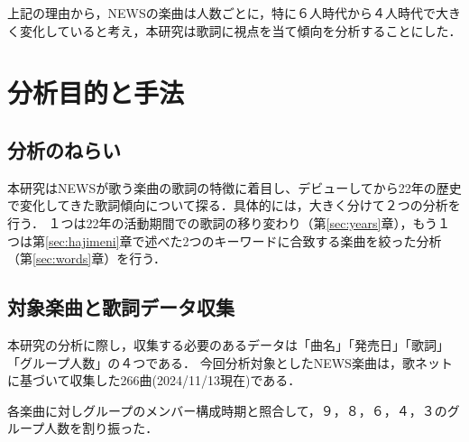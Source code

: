 
上記の理由から，NEWSの楽曲は人数ごとに，特に６人時代から４人時代で大きく変化していると考え，本研究は歌詞に視点を当て傾向を分析することにした．



\section{分析目的と手法}\label{sec:houhou}

\subsection{分析のねらい}

本研究はNEWSが歌う楽曲の歌詞の特徴に着目し、デビューしてから22年の歴史で変化してきた歌詞傾向について探る．具体的には，大きく分けて２つの分析を行う．
１つは22年の活動期間での歌詞の移り変わり（第\ref{sec:years}章），もう１つは第\ref{sec:hajimeni}章で述べた2つのキーワード\senaka \emotional に合致する楽曲を絞った分析（第\ref{sec:words}章）を行う．



\subsection{対象楽曲と歌詞データ収集} \label{sec:lyrics}


本研究の分析に際し，収集する必要のあるデータは「曲名」「発売日」「歌詞」「グループ人数」の４つである．
今回分析対象としたNEWS楽曲は，歌ネット\cite{utanet}に基づいて収集した266曲(2024/11/13現在)である．


各楽曲に対しグループのメンバー構成時期と照合して，９，８，６，４，３のグループ人数を割り振った．


